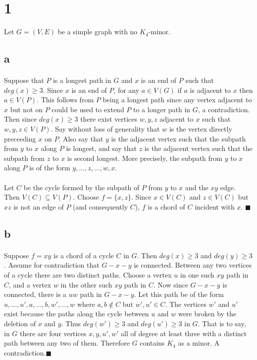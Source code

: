 \documentclass[letterpaper,12pt,oneside,onecolumn]{report}
\begin{document}
\section*{1}
Let $G = (V,E)$ be a simple graph with no $K_4$-minor.
\subsection*{a}
\paragraph{}
Suppose that $P$ is a longest path in $G$ and $x$ is an end of $P$ such that $deg(x) \geq 3$.
Since $x$ is an end of $P$, for any $a \in V(G)$ if $a$ is adjacent to $x$ then $a \in V(P)$. This follows from $P$ being a longest path since any vertex adjacent to $x$ but not on $P$ could be used to extend $P$ to a longer path in $G$, a contradiction. Then since $deg(x) \geq 3$ there exist vertices $w,y,z$ adjacent to $x$ such that $w, y, z \in V(P)$. Say without loss of generality that $w$ is the vertex directly preceeding $x$ on $P$. Also say that $y$ is the adjacent vertex such that the subpath from $y$ to $x$ along $P$ is longest, and say that $z$ is the adjacent vertex such that the subpath from $z$ to $x$ is second longest. More precisely, the subpath from $y$ to $x$ along $P$ is of the form $y,\dots,z,\dots,w,x$.
\paragraph{}
Let $C$ be the cycle formed by the subpath of $P$ from $y$ to $x$ and the $xy$ edge. Then $V(C) \subseteq V(P)$. Choose $f = \{x,z\}$. Since $x \in V(C)$ and $z \in V(C)$ but $xz$ is not an edge of $P$ (and consequently $C$), $f$ is a chord of $C$ incident with $x$. $\blacksquare$
\subsection*{b}
\paragraph{}
Suppose $f = xy$ is a chord of a cycle $C$ in $G$. Then $deg(x) \geq 3$ and $deg(y) \geq 3$. Assume for contradiction that $G-x-y$ is connected. Between any two vertices of a cycle there are two distinct paths. Choose a vertex $u$ in one such $xy$ path in $C$, and a vertex $w$ in the other such $xy$ path in $C$. Now since $G-x-y$ is connected, there is a $uw$ path in $G-x-y$. Let this path be of the form $u,\dots,u',a,\dots,b,w',\dots,w$ where $a,b \not\in C$ but $w',u' \in C$. The vertices $w'$ and $u'$ exist because the paths along the cycle between $u$ and $w$ were broken by the deletion of $x$ and $y$. Thus $deg(w') \geq 3$ and $deg(u') \geq 3$ in $G$. That is to say, in $G$ there are four vertices $x,y,u',w'$ all of degree at least three with a distinct path between any two of them. Therefore $G$ contains $K_4$ as a minor. A contradiction.$\blacksquare$
\end{document}
